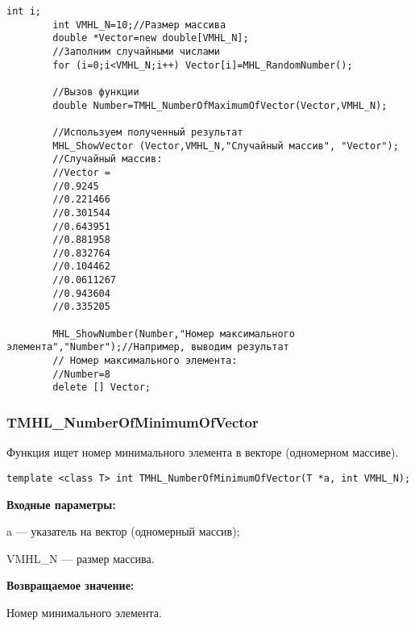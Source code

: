 \documentclass[a4paper,12pt]{article}
\begin{document}
\begin{lstlisting}[label=code_use_TMHL_NumberOfMaximumOfVector,caption=Пример использования]
        int i;
        int VMHL_N=10;//Размер массива
        double *Vector=new double[VMHL_N];
        //Заполним случайными числами
        for (i=0;i<VMHL_N;i++) Vector[i]=MHL_RandomNumber();

        //Вызов функции
        double Number=TMHL_NumberOfMaximumOfVector(Vector,VMHL_N);

        //Используем полученный результат
        MHL_ShowVector (Vector,VMHL_N,"Случайный массив", "Vector");
        //Случайный массив:
        //Vector =
        //0.9245
        //0.221466
        //0.301544
        //0.643951
        //0.881958
        //0.832764
        //0.104462
        //0.0611267
        //0.943604
        //0.335205

        MHL_ShowNumber(Number,"Номер максимального элемента","Number");//Например, выводим результат
        // Номер максимального элемента:
        //Number=8
        delete [] Vector;
\end{lstlisting}

\subsubsection{TMHL\_NumberOfMinimumOfVector}\label{TMHL_NumberOfMinimumOfVector}

Функция ищет номер минимального элемента в векторе (одномерном массиве).


\begin{lstlisting}[label=code_syntax_TMHL_NumberOfMinimumOfVector,caption=Синтаксис]
template <class T> int TMHL_NumberOfMinimumOfVector(T *a, int VMHL_N);
\end{lstlisting}

\textbf{Входные параметры:}

 a --- указатель на вектор (одномерный массив);
 
 VMHL\_N --- размер массива.

\textbf{Возвращаемое значение:}

Номер минимального элемента.
\end{document}
